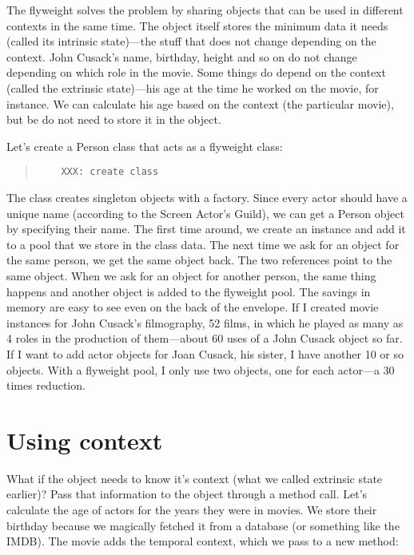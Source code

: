 The flyweight solves the problem by sharing objects that can be used
in different contexts in the same time.  The object itself stores the
minimum data it needs (called its intrinsic state)---the stuff that
does not change depending on the context.  John Cusack's name,
birthday, height and so on do not change depending on which role in
the movie. Some things do depend on the context (called the extrinsic
state)---his age at the time he worked on the movie, for instance.  We
can calculate his age based on the context (the particular movie), but
be do not need to store it in the object.

Let's create a Person class that acts as a flyweight class:


\begin{quote}
\begin{verbatim}
	XXX: create class
\end{verbatim}
\end{quote}
		
	
The class creates singleton objects with a factory.  Since every actor
should have a unique name (according to the Screen Actor's Guild), we
can get a Person object by specifying their name.  The first time
around, we create an instance and add it to a pool that we store in
the class data.  The next time we ask for an object for the same
person, we get the same object back.  The two references point to the
same object.  When we ask for an object for another person, the same
thing happens and another object is added to the flyweight pool.  The
savings in memory are easy to see even on the back of the envelope. 
If I created movie instances for John Cusack's filmography, 52 films,
in which he played as many as 4 roles in the production of
them---about 60 uses of a John Cusack object so far. If I want to add
actor objects for Joan Cusack, his sister, I have another 10 or so
objects.  With a flyweight pool, I only use two objects, one for each
actor---a 30 times reduction.

	\section{Using context}
	
What if the object needs to know it's context (what we called
extrinsic state earlier)?  Pass that information to the object through
a method call.  Let's calculate the age of actors for the years they
were in movies. We store their birthday because we magically fetched
it from a database (or something like the IMDB).  The movie adds the
temporal context, which we pass to a new method:

